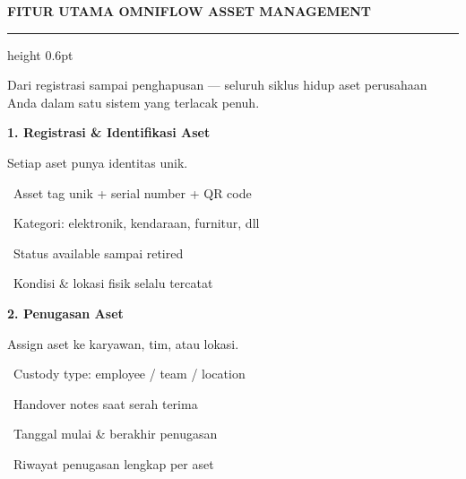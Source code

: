 \documentclass[a4paper]{article}
\newcommand{\sectiontitle}[1]{%
    \vspace{10pt}%
    {\fontsize{13}{16}\selectfont\bfseries\color{BlueDark} #1}\par\vspace{3pt}%
    {\color{BluePrimary}\hrule height 0.6pt}\par\vspace{8pt}}
\begin{document}
\sectiontitle{FITUR UTAMA OMNIFLOW ASSET MANAGEMENT}

{\fontsize{9.5}{13}\selectfont\color{TextLight}
Dari registrasi sampai penghapusan --- seluruh siklus hidup aset perusahaan Anda dalam satu sistem yang terlacak penuh.}

\vspace{6pt}

\noindent
\begin{minipage}[t]{0.485\textwidth}
    \colorbox{BluePrimary}{%
        \begin{minipage}{\dimexpr\textwidth-2\fboxsep\relax}
            {\fontsize{10}{13}\selectfont\bfseries\color{White} 1. Registrasi \& Identifikasi Aset}
        \end{minipage}}\par
    \vspace{4pt}
    {\fontsize{9}{12}\selectfont\color{TextDark}%
    Setiap aset punya identitas unik.\par\vspace{3pt}
    \textbullet\ Asset tag unik + serial number + QR code\par\vspace{2pt}%
    \textbullet\ Kategori: elektronik, kendaraan, furnitur, dll\par\vspace{2pt}%
    \textbullet\ Status available sampai retired\par\vspace{2pt}%
    \textbullet\ Kondisi \& lokasi fisik selalu tercatat}%
\end{minipage}%
\hfill
\begin{minipage}[t]{0.485\textwidth}
    \colorbox{EmeraldPrimary}{%
        \begin{minipage}{\dimexpr\textwidth-2\fboxsep\relax}
            {\fontsize{10}{13}\selectfont\bfseries\color{White} 2. Penugasan Aset}
        \end{minipage}}\par
    \vspace{4pt}
    {\fontsize{9}{12}\selectfont\color{TextDark}%
    Assign aset ke karyawan, tim, atau lokasi.\par\vspace{3pt}
    \textbullet\ Custody type: employee / team / location\par\vspace{2pt}%
    \textbullet\ Handover notes saat serah terima\par\vspace{2pt}%
    \textbullet\ Tanggal mulai \& berakhir penugasan\par\vspace{2pt}%
    \textbullet\ Riwayat penugasan lengkap per aset}%
\end{minipage}
\end{document}
